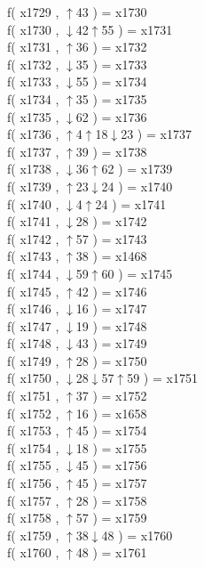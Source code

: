 f( x1729 , $\uparrow$43 ) = x1730 \\
f( x1730 , $\downarrow$42$\uparrow$55 ) = x1731 \\
f( x1731 , $\uparrow$36 ) = x1732 \\
f( x1732 , $\downarrow$35 ) = x1733 \\
f( x1733 , $\downarrow$55 ) = x1734 \\
f( x1734 , $\uparrow$35 ) = x1735 \\
f( x1735 , $\downarrow$62 ) = x1736 \\
f( x1736 , $\uparrow$4$\uparrow$18$\downarrow$23 ) = x1737 \\
f( x1737 , $\uparrow$39 ) = x1738 \\
f( x1738 , $\downarrow$36$\uparrow$62 ) = x1739 \\
f( x1739 , $\uparrow$23$\downarrow$24 ) = x1740 \\
f( x1740 , $\downarrow$4$\uparrow$24 ) = x1741 \\
f( x1741 , $\downarrow$28 ) = x1742 \\
f( x1742 , $\uparrow$57 ) = x1743 \\
f( x1743 , $\uparrow$38 ) = x1468 \\
f( x1744 , $\downarrow$59$\uparrow$60 ) = x1745 \\
f( x1745 , $\uparrow$42 ) = x1746 \\
f( x1746 , $\downarrow$16 ) = x1747 \\
f( x1747 , $\downarrow$19 ) = x1748 \\
f( x1748 , $\downarrow$43 ) = x1749 \\
f( x1749 , $\uparrow$28 ) = x1750 \\
f( x1750 , $\downarrow$28$\downarrow$57$\uparrow$59 ) = x1751 \\
f( x1751 , $\uparrow$37 ) = x1752 \\
f( x1752 , $\uparrow$16 ) = x1658 \\
f( x1753 , $\uparrow$45 ) = x1754 \\
f( x1754 , $\downarrow$18 ) = x1755 \\
f( x1755 , $\downarrow$45 ) = x1756 \\
f( x1756 , $\uparrow$45 ) = x1757 \\
f( x1757 , $\uparrow$28 ) = x1758 \\
f( x1758 , $\uparrow$57 ) = x1759 \\
f( x1759 , $\uparrow$38$\downarrow$48 ) = x1760 \\
f( x1760 , $\uparrow$48 ) = x1761 \\
